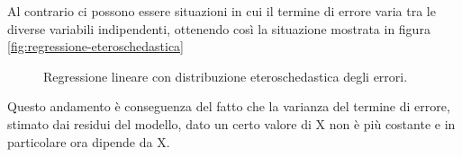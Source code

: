 Al contrario ci possono essere situazioni in cui il termine di errore varia tra le diverse variabili indipendenti, ottenendo così la situazione mostrata in figura \ref{fig:regressione-eteroschedastica}
\begin{figure}
	\centering
	\caption{Regressione lineare con distribuzione eteroschedastica degli errori.}
	\label{fig: regressione-eteroschedastica}
\end{figure} 
Questo andamento è conseguenza del fatto che la varianza del termine di errore, stimato dai residui del modello, dato un certo valore di X non è più costante e in particolare ora dipende da X.

